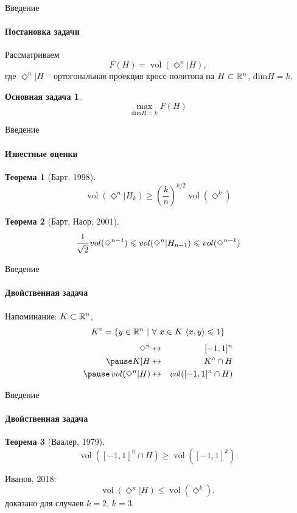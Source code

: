 \documentclass{beamer}
\def\vol{\mathop{vol}}
\def\dim{\text{dim}}
\newtheorem{thrm}{Теорема}
\newtheorem{task}{Основная задача}
\newcommand{\crosp}{\Diamond}
\begin{document}
\begin{frame}{Введение}
	\framesubtitle{Постановка задачи}
	Рассматриваем
		$$F(H)=\vol(\crosp^n|H),$$
	где $\crosp^n|H$ -- ортогональная проекция кросс-политопа на $H\subset\mathbb {R}^n$, $\dim H=k$.\\\pause
	\begin{task}
		\begin{equation*}
			\max_{\dim H=k}F(H)
		\end{equation*}
	\end{task}
\end{frame}

\begin{frame}{Введение}
	\framesubtitle{Известные оценки}
	\begin{thrm}[Барт, 1998]
		\begin{equation*}
			\vol(\crosp^n|H_k)\geqslant\left(\frac{k}{n}\right)^{k/2}\vol(\crosp^k)
		\end{equation*}\pause
	\end{thrm}
	\begin{thrm}[Барт, Наор, 2001]
		\begin{equation*}
			\cfrac{1}{\sqrt2}\vol(\crosp^{n-1})\leqslant\vol(\crosp^n|H_{n-1})\leqslant\vol(\crosp^{n-1})
		\end{equation*}
	\end{thrm}
\end{frame}

\begin{frame}{Введение}
	\framesubtitle{Двойственная задача}
	Напоминание: $K\subset\mathbb {R}^n$,
		$$K^{\circ}=\{y\in\RR^n \ |\ \forall\ x\in K\ \langle x,y\rangle\leqslant 1\}$$
	\begin{eqnarray*}
		\crosp^n&\leftrightarrow&[-1,1]^n\\\pause
		K|H&\leftrightarrow&K^{\circ}\cap H\\\pause
		\vol(\crosp^n|H)&\leftrightarrow&\vol([-1,1]^n\cap H)\\
	\end{eqnarray*}
\end{frame}

\begin{frame}{Введение}
	\framesubtitle{Двойственная задача}
	\begin{thrm}[Ваалер, 1979]
		\begin{equation*}
			\vol([-1,1]^n\cap H)\geqslant\vol([-1,1]^k).
		\end{equation*}
	\end{thrm}\pause
	Иванов, 2018:
		\begin{equation*}
			\vol(\crosp^n|H)\leqslant\vol(\crosp^k),
		\end{equation*}
	доказано для случаев $k=2$, $k=3$.
\end{frame}
\end{document}
